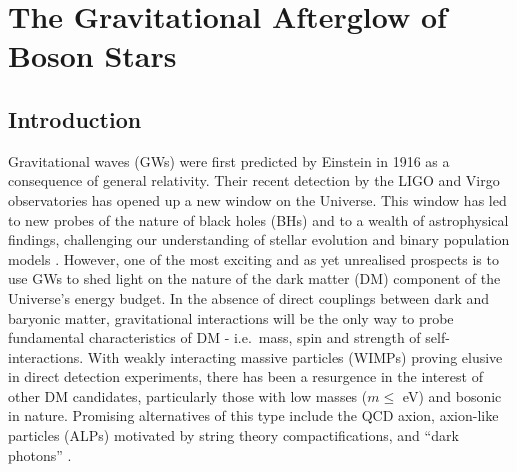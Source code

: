 



\section{The Gravitational Afterglow of Boson Stars}
\subsection{Introduction} \label{ag:sect:intro2}



Gravitational waves (GWs) were first predicted by Einstein in 1916 as
a consequence of general relativity.  Their recent detection by the
LIGO and Virgo observatories has opened up a new window on the
Universe. This window has led to new probes of the nature of black holes
(BHs) and to a wealth of astrophysical findings, challenging our
understanding of stellar evolution and binary population models \cite{LIGOScientific:2016aoc,LIGOScientific:2018jsj,LIGOScientific:2020kqk,LIGOScientific:2021psn}.
However, one of the most exciting and as yet unrealised prospects is
to use GWs to shed light on the nature of the dark matter (DM)
component of the Universe's energy budget. In the absence of direct
couplings between dark and baryonic matter, gravitational interactions will be the only way to
probe fundamental characteristics of DM - i.e.~mass, spin and strength
of self-interactions.  With weakly interacting massive particles (WIMPs)
proving elusive in direct detection experiments, there has been a resurgence in the interest of other DM
candidates, particularly those with low masses ($m \leq $ eV) and bosonic in nature.
Promising alternatives of this type include the QCD axion, axion-like particles
(ALPs) motivated by string theory compactifications, and ``dark
photons'' \cite{Arkani-Hamed:2008hhe,Feng:2010gw,Marsh:2015xka,Svrcek:2006yi,Kim:1986ax,Arvanitaki:2009fg,Ringwald:2012cu,Wilczek:1977pj,Peccei:1977hh,Weinberg:1977ma}.

